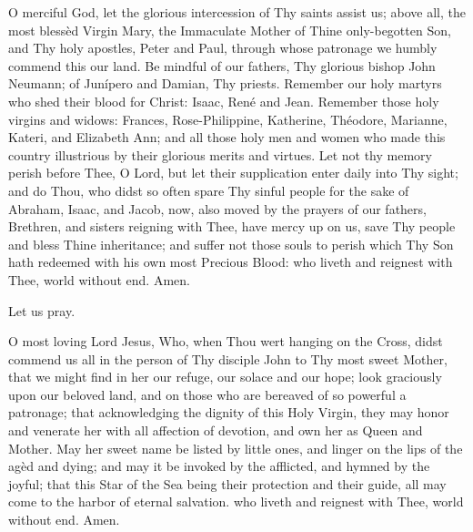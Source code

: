
\lettrine{O}{} merciful God, let the glorious intercession of Thy saints assist us; above all, the most blessèd Virgin Mary, the Immaculate Mother of Thine only-begotten Son, and Thy holy apostles, Peter and Paul, through whose patronage we humbly commend this our land. Be mindful of our fathers, Thy glorious bishop John Neumann; of Junípero and Damian, Thy priests. Remember our holy martyrs who shed their blood for Christ: Isaac, René and Jean. Remember those holy virgins and widows: Frances, Rose-Philippine, Katherine, Théodore, Marianne, Kateri, and Elizabeth Ann; and all those holy men and women who made this country illustrious by their glorious merits and virtues. Let not thy memory perish before Thee, O Lord, but let their supplication enter daily into Thy sight; and do Thou, who didst so often spare Thy sinful people for the sake of Abraham, Isaac, and Jacob, now, also moved by the prayers of our fathers, Brethren, and sisters reigning with Thee, have mercy up on us, save Thy people and bless Thine inheritance; and suffer not those souls to perish which Thy Son hath redeemed with his own most Precious Blood: who liveth and reignest with Thee, world without end. \rr Amen.
\smallskip

Let us pray.

\lettrine{O}{} most loving Lord Jesus, Who, when Thou wert hanging on the Cross, didst commend us all in the person of Thy disciple John to Thy most sweet Mother, that we might find in her our refuge, our solace and our hope; look graciously upon our beloved land, and on those who are bereaved of so powerful a patronage; that acknowledging the dignity of this Holy Virgin, they may honor and venerate her with all affection of devotion, and own her as Queen and Mother. May her sweet name be listed by little ones, and linger on the lips of the agèd and dying; and may it be invoked by the afflicted, and hymned by the joyful; that this Star of the Sea being their protection and their guide, all may come to the harbor of eternal salvation. who liveth and reignest with Thee, world without end. \rr Amen.

